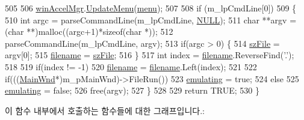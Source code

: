 \begin{DoxyCode}
505   
506   \mbox{\hyperlink{class_v_b_a_ad7ebce057dbde0ca88cee75e84721a89}{winAccelMgr}}.\mbox{\hyperlink{class_c_accelerator_manager_ac7411d20f413ea0ec3bd65705b564adf}{UpdateMenu}}(\mbox{\hyperlink{class_v_b_a_acf9d855b5b959a2df9c6cb21b888366e}{menu}});
507 
508   \textcolor{keywordflow}{if} (m\_lpCmdLine[0])
509     \{
510       \textcolor{keywordtype}{int} argc = parseCommandLine(m\_lpCmdLine, \mbox{\hyperlink{getopt1_8c_a070d2ce7b6bb7e5c05602aa8c308d0c4}{NULL}});
511       \textcolor{keywordtype}{char} **argv = (\textcolor{keywordtype}{char} **)malloc((argc+1)*\textcolor{keyword}{sizeof}(\textcolor{keywordtype}{char} *));
512       parseCommandLine(m\_lpCmdLine, argv);
513       \textcolor{keywordflow}{if}(argc > 0) \{
514         \mbox{\hyperlink{class_v_b_a_ac85720ef4e00c5455be15266b7119045}{szFile}} = argv[0];
515         \mbox{\hyperlink{class_v_b_a_a66eee6b61ec8bee20f21164cb0c37d2d}{filename}} = \mbox{\hyperlink{class_v_b_a_ac85720ef4e00c5455be15266b7119045}{szFile}};
516       \}
517       \textcolor{keywordtype}{int} index = \mbox{\hyperlink{class_v_b_a_a66eee6b61ec8bee20f21164cb0c37d2d}{filename}}.ReverseFind(\textcolor{charliteral}{'.'});
518 
519       \textcolor{keywordflow}{if}(index != -1)
520         \mbox{\hyperlink{class_v_b_a_a66eee6b61ec8bee20f21164cb0c37d2d}{filename}} = \mbox{\hyperlink{class_v_b_a_a66eee6b61ec8bee20f21164cb0c37d2d}{filename}}.Left(index);
521       
522       \textcolor{keywordflow}{if}(((\mbox{\hyperlink{class_main_wnd}{MainWnd}}*)m\_pMainWnd)->FileRun())
523         \mbox{\hyperlink{_v_b_a_8cpp_af9cc36078b1b311753963297ae7f2a74}{emulating}} = \textcolor{keyword}{true};
524       \textcolor{keywordflow}{else}
525         \mbox{\hyperlink{_v_b_a_8cpp_af9cc36078b1b311753963297ae7f2a74}{emulating}} = \textcolor{keyword}{false};
526       free(argv);
527     \}
528         
529   \textcolor{keywordflow}{return} TRUE;
530 \}
\end{DoxyCode}
이 함수 내부에서 호출하는 함수들에 대한 그래프입니다.\+:
\nopagebreak
